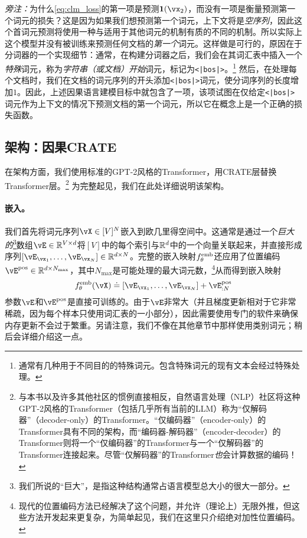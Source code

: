 \documentclass[../../book-main_zh.tex]{subfiles}
\begin{document}
\textit{旁注：}为什么\eqref{eq:clm_loss}的第一项是预测\(\vone(\vx_{2})\)，而没有一项是衡量预测第一个词元的损失？这是因为如果我们想预测第一个词元，上下文将是\textit{空序列}，因此这个首词元预测将使用一种与适用于其他词元的机制有质的不同的机制。所以实际上这个模型并没有被训练来预测任何文档的\textit{第一个}词元。这样做是可行的，原因在于分词器的一个实现细节：通常，在构建分词器之后，我们会在其词汇表中插入一个\textit{特殊}词元，称为\textit{字符串（或文档）开始}词元，标记为\texttt{<|bos|>}。\footnote{通常有几种用于不同目的的特殊词元。包含特殊词元的现有文本会经过特殊处理。} 然后，在处理每个文档时，我们在文档的词元序列的开头添加\texttt{<|bos|>}词元，使分词序列的长度增加\(1\)。因此，上述因果语言建模目标中就包含了一项，该项试图在仅给定\texttt{<|bos|>}词元作为上下文的情况下预测文档的第一个词元，所以它在概念上是一个正确的损失函数。

\subsection{架构：因果CRATE}

在架构方面，我们使用标准的GPT-2风格的Transformer，用CRATE层替换Transformer层。\footnote{与本书以及许多其他社区的惯例直接相反，自然语言处理（NLP）社区将这种GPT-2风格的Transformer（包括几乎所有当前的LLM）称为“仅解码器”（decoder-only）的Transformer。“仅编码器”（encoder-only）的Transformer具有不同的架构，而“编码器-解码器”（encoder-decoder）的Transformer则将一个“仅编码器”的Transformer与一个“仅解码器”的Transformer连接起来。尽管“仅解码器”的Transformer\textit{也}会计算数据的编码！} 为完整起见，我们在此处详细说明该架构。

\paragraph{嵌入。} 我们首先将词元序列\(\vX \in [V]^{N}\)嵌入到欧几里得空间中。这通常是通过一个\textit{巨大的}\footnote{我们所说的“巨大”，是指这种结构通常占语言模型总大小的很大一部分。}数组\(\vE \in \R^{V \times d}\)将\([V]\)中的每个索引与\(\mathbb{R}^{d}\)中的一个向量关联起来，并直接形成序列\([\vE_{\vx_{1}}, \dots, \vE_{\vx_{N}}] \in \R^{d \times N}\)。完整的嵌入映射\(f_{\theta}^{\mathrm{emb}}\)还应用了位置编码\(\vE^{\pos} \in \R^{d  \times N_{\max}}\)，其中\(N_{\max}\)是可能处理的最大词元数，\footnote{现代的位置编码方法已经解决了这个问题，并允许（理论上）无限外推，但这些方法开发起来更复杂，为简单起见，我们在这里只介绍绝对加性位置编码。}从而得到嵌入映射
\begin{equation}
    f_{\theta}^{\emb}(\vX) \doteq [\vE_{\vx_{1}}, \dots, \vE_{\vx_{N}}] + \vE_{:N}^{\pos}
\end{equation}
参数\(\vE\)和\(\vE^{\pos}\)是直接可训练的。由于\(\vE\)非常大（并且梯度更新相对于它非常稀疏，因为每个样本只使用词汇表的一小部分），因此需要使用专门的软件来确保内存更新不会过于繁重。另请注意，我们不像在其他章节中那样使用类别词元；稍后会详细介绍这一点。
\end{document}

